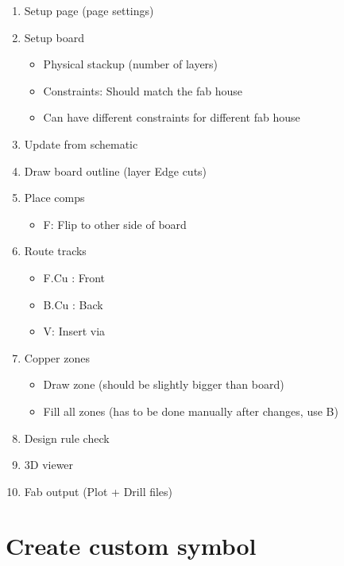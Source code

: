 \documentclass[11pt]{scrartcl} %
\begin{document}
\begin{enumerate}
	\item Setup page (page settings)
	\item Setup board 
	\begin{itemize}
		\item Physical stackup (number of layers)
		\item Constraints: Should match the fab house
		\item Can have different constraints for different fab house
	\end{itemize}
	\item Update from schematic
	\item Draw board outline (layer Edge cuts)
	\item Place comps
	\begin{itemize}
		\item F: Flip to other side of board
	\end{itemize}
	\item Route tracks
	\begin{itemize}
		\item F.Cu : Front
		\item B.Cu : Back
		\item V: Insert via
	\end{itemize}
	\item Copper zones
	\begin{itemize}
		\item Draw zone (should be slightly bigger than board)
		\item Fill all zones (has to be done manually after changes, use B)
	\end{itemize}
	\item Design rule check
	\item 3D viewer
	\item Fab output (Plot + Drill files)
\end{enumerate}

\section{Create custom symbol}
\end{document}

